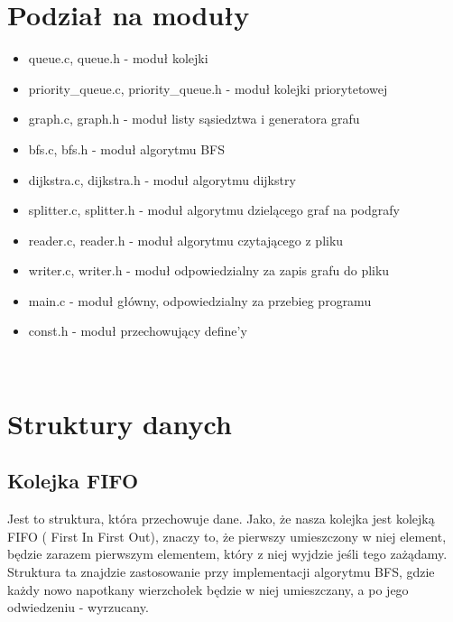 \documentclass{article}
\begin{document}
\section{Podział na moduły}
\begin{itemize}
\item queue.c, queue.h - moduł kolejki
\item priority\_queue.c, priority\_queue.h - moduł kolejki priorytetowej
\item graph.c, graph.h - moduł listy sąsiedztwa i generatora grafu
\item bfs.c, bfs.h - moduł algorytmu BFS
\item dijkstra.c, dijkstra.h - moduł algorytmu dijkstry
\item splitter.c, splitter.h - moduł algorytmu dzielącego graf na podgrafy
\item reader.c, reader.h - moduł algorytmu czytającego z pliku
\item writer.c, writer.h - moduł odpowiedzialny za zapis grafu do pliku
\item main.c - moduł główny, odpowiedzialny za przebieg programu
\item const.h - moduł przechowujący define'y
\end{itemize}

{ \\ }




\section{Struktury danych}
\subsection{Kolejka FIFO}
Jest to struktura, która przechowuje dane. Jako, że nasza kolejka jest kolejką FIFO ( First In First Out), znaczy to, że pierwszy umieszczony w niej element, będzie zarazem pierwszym elementem, który z niej wyjdzie jeśli tego zażądamy.
\\
Struktura ta znajdzie zastosowanie przy implementacji algorytmu BFS, gdzie każdy nowo napotkany wierzchołek będzie w niej umieszczany, a po jego odwiedzeniu - wyrzucany.
\end{document}
